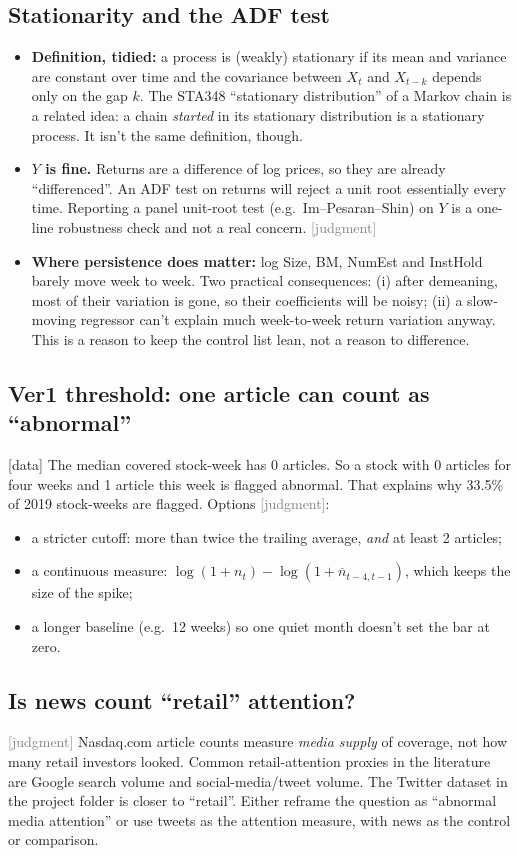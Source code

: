 \documentclass[11pt]{article}
\newcommand{\data}{\textcolor{NavyBlue}{\textsf{[data]}}}
\newcommand{\judg}{\textcolor{Gray}{\textsf{[judgment]}}}
\begin{document}
\subsection{Stationarity and the ADF test}
\begin{itemize}
  \item \textbf{Definition, tidied:} a process is (weakly) stationary if its mean and variance are constant over time and the covariance between $X_t$ and $X_{t-k}$ depends only on the gap $k$. The STA348 ``stationary distribution'' of a Markov chain is a related idea: a chain \emph{started} in its stationary distribution is a stationary process. It isn't the same definition, though.
  \item \textbf{$Y$ is fine.} Returns are a difference of log prices, so they are already ``differenced''. An ADF test on returns will reject a unit root essentially every time. Reporting a panel unit-root test (e.g.\ Im--Pesaran--Shin) on $Y$ is a one-line robustness check and not a real concern. \judg{}
  \item \textbf{Where persistence does matter:} log Size, BM, NumEst and InstHold barely move week to week. Two practical consequences: (i) after demeaning, most of their variation is gone, so their coefficients will be noisy; (ii) a slow-moving regressor can't explain much week-to-week return variation anyway. This is a reason to keep the control list lean, not a reason to difference.
\end{itemize}

\subsection{Ver1 threshold: one article can count as ``abnormal''}\label{iss:abn}
\data{} The median covered stock-week has 0 articles. So a stock with 0 articles for four weeks and 1 article this week is flagged abnormal. That explains why 33.5\% of 2019 stock-weeks are flagged. Options \judg{}:
\begin{itemize}
  \item a stricter cutoff: more than twice the trailing average, \emph{and} at least 2 articles;
  \item a continuous measure: $\log(1+n_t) - \log(1+\overline{n}_{t-4,t-1})$, which keeps the size of the spike;
  \item a longer baseline (e.g.\ 12 weeks) so one quiet month doesn't set the bar at zero.
\end{itemize}

\subsection{Is news count ``retail'' attention?}
\judg{} Nasdaq.com article counts measure \emph{media supply} of coverage, not how many retail investors looked. Common retail-attention proxies in the literature are Google search volume and social-media/tweet volume. The Twitter dataset in the project folder is closer to ``retail''. Either reframe the question as ``abnormal media attention'' or use tweets as the attention measure, with news as the control or comparison.
\end{document}
